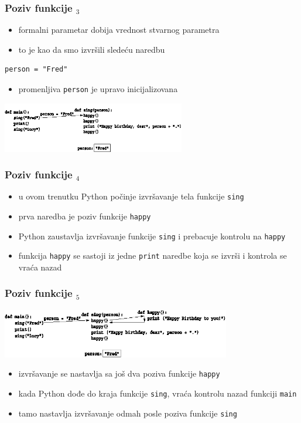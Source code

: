 \documentclass[utf8,compress]{beamer}
\begin{document}
\begin{frame}[fragile]
  \frametitle{Poziv funkcije $_3$}
  \begin{itemize}
    \item formalni parametar dobija vrednost stvarnog parametra
    \item to je kao da smo izvršili sledeću naredbu
  \end{itemize}
\begin{verbatim}
person = "Fred"
\end{verbatim}
  \begin{itemize}
    \item promenljiva \texttt{person} je upravo inicijalizovana
  \end{itemize}
  \begin{center}
    \includegraphics[width=8cm]{pic04}
  \end{center}
\end{frame}

\begin{frame}[fragile]
  \frametitle{Poziv funkcije $_4$}
  \begin{itemize}
    \item u ovom trenutku Python počinje izvršavanje tela funkcije \texttt{sing}
    \item prva naredba je poziv funkcije \texttt{happy}
    \item Python zaustavlja izvršavanje funkcije \texttt{sing} i prebacuje kontrolu na \texttt{happy}
    \item funkcija \texttt{happy} se sastoji iz jedne \texttt{print} naredbe koja se izvrši i kontrola se vraća nazad
  \end{itemize}
\end{frame}

\begin{frame}[fragile]
  \frametitle{Poziv funkcije $_5$}
  \begin{center}
    \includegraphics[width=10cm]{pic05}
  \end{center}
  \begin{itemize}
    \item izvršavanje se nastavlja sa još dva poziva funkcije \texttt{happy}
    \item kada Python dođe do kraja funkcije \texttt{sing}, vraća kontrolu nazad funkciji \texttt{main}
    \item tamo nastavlja izvršavanje odmah posle poziva funkcije \texttt{sing}
  \end{itemize}
\end{frame}
\end{document}
